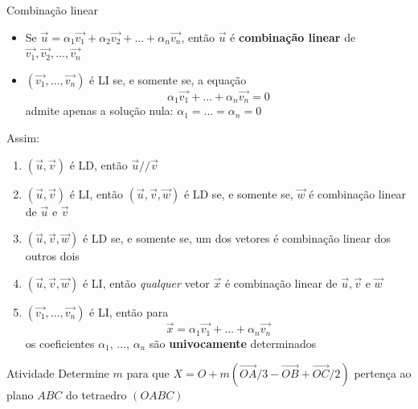 \begin{frame}{Combinação linear}
    \begin{itemize}
        \item Se \(\vec{u}=\alpha_1 \vec{v_1} +\alpha_2 \vec{v_2} + \ldots +\alpha_n \vec{v_n}\), então
            \(\vec{u}\) é \textbf{combinação linear} de \(\vec{v_1}, \vec{v_2}, \ldots, \vec{v_n}\)
            \pause
        \item \((\vec{v_1},\ldots,\vec{v_n})\) é LI se, e somente se, a equação
            \[
                \alpha_1 \vec{v_1}+\ldots+\alpha_n \vec{v_n}=0
            \]
            admite apenas a solução nula: \(\alpha_1=\ldots=\alpha_n=0\)
    \end{itemize}

    \pause
    Assim:
    \begin{enumerate}
        \item \((\vec{u}, \vec{v})\) é LD, então \(\vec{u} // \vec{v}\)
        \item \((\vec{u}, \vec{v})\) é LI, então \((\vec{u}, \vec{v}, \vec{w})\) é LD se, e somente se, \(\vec{w}\) é combinação linear de \(\vec{u}\) e \(\vec{v}\)
        \item \((\vec{u}, \vec{v}, \vec{w})\) é LD se, e somente se, um dos vetores é combinação linear dos outros dois
        \item \((\vec{u}, \vec{v}, \vec{w})\) é LI, então \textit{qualquer} vetor \(\vec{x}\) é combinação linear de \(\vec{u}, \vec{v} \text{ e } \vec{w}\)
            \pause
        \item \((\vec{v_1},\ldots, \vec{v_n})\) é LI, então para
            \[
                \vec{x} = \alpha_1 \vec{v_1}+\ldots+\alpha_n \vec{v_n}
            \]
            os coeficientes \(\alpha_1\), \(\ldots\), \(\alpha_n\) são \textbf{univocamente} determinados
    \end{enumerate}
\end{frame}

\begin{frame}{Atividade}
    Determine \(m\) para que \(X=O+m(\vec{OA}/3-\vec{OB}+\vec{OC}/2)\) pertença ao plano \(ABC\) do tetraedro \((OABC)\)

    \centering
\end{frame}

